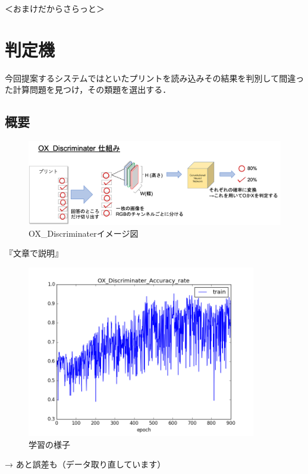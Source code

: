 \documentclass[a4j,11pt,report]{jsbook}
\begin{document}
＜おまけだからさらっと＞
\section{判定機}
今回提案するシステムではといたプリントを読み込みその結果を判別して間違った計算問題を見つけ，その類題を選出する．
\subsection{概要}

\begin{figure}[ht]
  \begin{center}
    \includegraphics[width = 15cm]{image/OX_Discriminater.png}
    \caption{OX_Discriminaterイメージ図}
    \label{fig:OX_Discriminater_image}
  \end{center}
\end{figure}

『文章で説明』

\begin{figure}[ht]
  \begin{center}
    \includegraphics[width = 10cm]{image/OX_Discriminater_Accuracy_rateplot.png}
    \caption{学習の様子}
    \label{fig:OX_AccRate}
  \end{center}
\end{figure}

→ あと誤差も（データ取り直しています）
\end{document}
